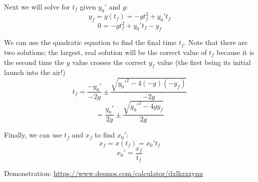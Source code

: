 \documentclass[12pt]{article}
\begin{document}
Next we will solve for $t_f$ given $y_0'$ and $g$:
\[ y_f = y(t_f) = -gt_f^2 + y_0't_f \]
\[ 0 = -gt_f^2 + y_0't_f - y_f \]

We can use the quadratic equation to find the final time $t_f$. Note that there are two solutions; the largest, real solution will be the correct value of $t_f$ because it is the second time the $y$ value crosses the correct $y_f$ value (the first being its initial launch into the air!)
\[ t_f = \frac{-y_0'}{-2g} \pm \frac{\sqrt{ y_0'^2 - 4(-g)(-y_f) }}{-2g} \]
\[ = \frac{y_0'}{2g} \pm \frac{\sqrt{ y_0'^2 - 4gy_f }}{2g} \]

Finally, we can use $t_f$ and $x_f$ to find $x_0'$:
\[ x_f = x(t_f) = x_0't_f \]
\[ x_0' = \frac{x_f}{t_f} \]


Demonstration:
\url{https://www.desmos.com/calculator/dxlkzxzynn}
\end{document}
